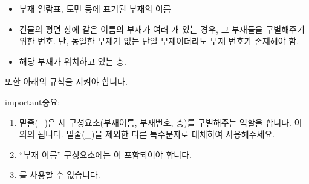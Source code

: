 \documentclass[a4paper,10pt,korean]{sphinxmanual}
\begin{document}
\begin{figure}[htbp]
\centering
\capstart

\noindent{}
\caption{}\label{\detokenize{2_naming_rules:id4}}\end{figure}
\begin{itemize}
\item {} \begin{description}
\sphinxAtStartPar
부재 일람표, 도면 등에 표기된 부재의 이름

\end{description}

\item {} \begin{description}
\sphinxAtStartPar
건물의 평면 상에 같은 이름의 부재가 여러 개 있는 경우, 그 부재들을 구별해주기 위한 번호.
단, 동일한 부재가 없는 단일 부재이더라도 부재 번호가 존재해야 함.

\end{description}

\item {} \begin{description}
\sphinxAtStartPar
해당 부재가 위치하고 있는 층.

\end{description}

\end{itemize}

\sphinxAtStartPar
또한 아래의 규칙을 지켜야 합니다.

\begin{sphinxadmonition}{important}{중요:}\begin{enumerate}
%
\item {} 
\sphinxAtStartPar
밑줄(\_)은 세 구성요소(부재이름, 부재번호, 층)를 구별해주는 역할을 합니다. 이 외의 됩니다.
밑줄(\_)을 제외한 다른 특수문자로 대체하여 사용해주세요.

\item {} 
\sphinxAtStartPar
“부재 이름” 구성요소에는 이 포함되어야 합니다.

\item {} 
\sphinxAtStartPar
{}를 사용할 수 없습니다.

\end{enumerate}
\end{sphinxadmonition}
\end{document}
